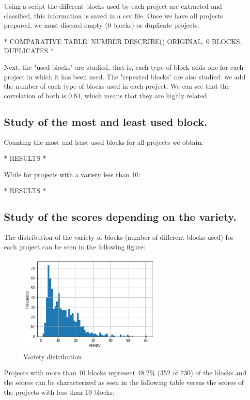 \documentclass[a4paper]{article}
\begin{document}
Using a script the different blocks used by each project are extracted and classified, this information is saved in a csv file. Once we have all projects prepared, we must discard empty (0 blocks) or duplicate projects.

* COMPARATIVE TABLE: NUMBER DESCRIBE() ORIGINAL, 0 BLOCKS, DUPLICATES *

Next, the "used blocks" are studied, that is, each type of block adds one for each project in which it has been used. The "repeated blocks" are also studied: we add the number of each type of blocks used in each project. We can see that the correlation of both is 0.84, which means that they are highly related.

\subsection{Study of the most and least used block.}

Counting the most and least used blocks for all projects we obtain:

* RESULTS *

While for projects with a variety less than 10:

* RESULTS *


\subsection{Study of the scores depending on the variety.}

The distribution of the variety of blocks (number of different blocks used) for each project can be seen in the following figure:

\begin{figure}[ht]
\begin{center}
\includegraphics[height=5cm]{fig1}
\caption{Variety distribution }
\label{fig1}
\end{center}
\end{figure}

Projects with more than 10 blocks represent 48.2\% (352 of 730) of the blocks and the scores can be characterized as seen in the following table versus the scores of the projects with less than 10 blocks:
\end{document}
